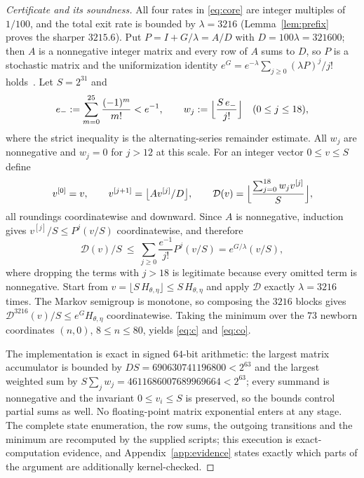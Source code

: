 \documentclass[11pt,a4paper]{article}
\theoremstyle{plain}
\theoremstyle{definition}
\theoremstyle{remark}
\begin{document}
\begin{proof}[Certificate and its soundness]
All four rates in \eqref{eq:core} are integer multiples of $1/100$, and the total exit
rate is bounded by $\lambda=3216$ (Lemma~\ref{lem:prefix} proves the sharper
$3215.6$). Put $P=I+G/\lambda=A/D$ with $D=100\lambda=321600$; then $A$ is a nonnegative
integer matrix and every row of $A$ sums to $D$, so $P$ is a stochastic matrix and the
uniformization identity $e^{G}=e^{-\lambda}\sum_{j\ge0}(\lambda P)^j/j!$
holds~\citep{jensen1953,grassmann1977}. Let $S=2^{31}$ and
\begin{equation}
e_-:=\sum_{m=0}^{25}\frac{(-1)^m}{m!}<e^{-1},\qquad
w_j:=\Bigl\lfloor \frac{S\,e_-}{j!}\Bigr\rfloor\quad(0\le j\le 18),\label{eq:weights}
\end{equation}
where the strict inequality is the alternating-series remainder estimate. All $w_j$ are
nonnegative and $w_j=0$ for $j>12$ at this scale. For an integer vector $0\le v\le S$
define
\begin{equation}
v^{[0]}=v,\qquad v^{[j+1]}=\bigl\lfloor Av^{[j]}/D\bigr\rfloor,\qquad
\mathcal D(v)=\Bigl\lfloor \frac{\sum_{j=0}^{18}w_jv^{[j]}}{S}\Bigr\rfloor,
\label{eq:round}
\end{equation}
all roundings coordinatewise and downward. Since $A$ is nonnegative, induction gives
$v^{[j]}/S\le P^{j}(v/S)$ coordinatewise, and therefore
\begin{equation}
\mathcal D(v)/S\ \le\ \sum_{j\ge0}\frac{e^{-1}}{j!}P^{j}(v/S)=e^{G/\lambda}(v/S),
\end{equation}
where dropping the terms with $j>18$ is legitimate because every omitted term is
nonnegative. Start from $v=\lfloor S\,H_{\theta,\eta}\rfloor\le S\,H_{\theta,\eta}$ and
apply $\mathcal D$ exactly $\lambda=3216$ times. The Markov semigroup is monotone, so
composing the $3216$ blocks gives $\mathcal D^{3216}(v)/S\le e^{G}H_{\theta,\eta}$
coordinatewise. Taking the minimum over the $73$ newborn coordinates $(n,0)$,
$8\le n\le 80$, yields \eqref{eq:c} and \eqref{eq:co}.

The implementation is exact in signed $64$-bit arithmetic: the largest matrix
accumulator is bounded by $DS=690630741196800<2^{63}$ and the largest weighted sum by
$S\sum_j w_j=4611686007689969664<2^{63}$; every summand is nonnegative and the invariant
$0\le v_i\le S$ is preserved, so the bounds control partial sums as well. No
floating-point matrix exponential enters at any stage. The complete state enumeration,
the row sums, the outgoing transitions and the minimum are recomputed by the supplied
scripts; this execution is exact-computation evidence, and Appendix~\ref{app:evidence}
states exactly which parts of the argument are additionally kernel-checked.
\end{proof}
\end{document}
